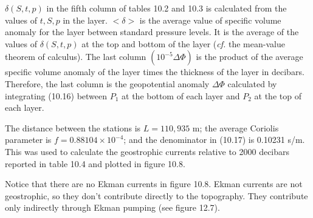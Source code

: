 $\delta (S, t, p)$ in the fifth column of tables 10.2 and 10.3 is calculated from
the values of $t, S, p$ in the layer.  $<\delta >$ is the average value of specific
volume anomaly for the layer between standard pressure levels. It is the average
of the values of $\delta (S, t, p)$ at the top and bottom of the layer (\textit{cf.} the mean-value theorem of calculus). The last
column $(10^{-5} \Delta\Phi)$ is the product of the average specific volume anomaly
of the layer times the thickness of the layer in decibars. Therefore, the last column
is the geopotential anomaly $\Delta \Phi$ calculated by integrating (10.16)
between $P_1$ at the bottom of each layer and $P_2$ at the top of each layer.

The distance between the stations is $L = 110,935$ m; the average Coriolis
parameter is $f = 0.88104 \times 10^{-4}$; and the denominator in
(10.17) is 0.10231 s/m. This was used to calculate the geostrophic currents relative to 2000 decibars
reported in table 10.4 and plotted in figure 10.8. 

Notice that there are no Ekman currents in figure 10.8.
Ekman currents are not geostrophic, so they don't contribute directly to the topography. They contribute only indirectly through Ekman pumping (see figure 12.7).


